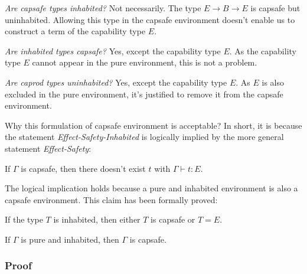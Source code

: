 \emph{Are capsafe types inhabited?} Not necessarily. The type
$E \to B \to E$ is capsafe but uninhabited. Allowing this type in the
capsafe environment doesn't enable us to construct a term of the
capability type $E$.

\emph{Are inhabited types capsafe?} Yes, except the capability type
$E$. As the capability type $E$ cannot appear in the pure environment,
this is not a problem.

\emph{Are caprod types uninhabited?} Yes, except the capability type
$E$. As $E$ is also excluded in the pure environment, it's justified
to remove it from the capsafe environment.


Why this formulation of capsafe environment is acceptable? In short,
it is because the statement \emph{Effect-Safety-Inhabited} is
logically implied by the more general statement \emph{Effect-Safety}:

\begin{definition}
  If $\Gamma$ is capsafe, then there doesn't exist $t$ with
  $\Gamma \vdash t : E$.
\end{definition}

The logical implication holds because a pure and inhabited environment
is also a capsafe environment. This claim has been formally proved:

\begin{lemma}
  If the type $T$ is inhabited, then either $T$ is capsafe or $T = E$.
\end{lemma}

\begin{theorem}
  If $\Gamma$ is pure and inhabited, then $\Gamma$ is capsafe.
\end{theorem}


\subsubsection{Proof}

